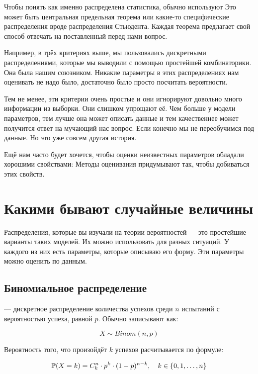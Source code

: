 \documentclass[12pt, a4paper, oneside]{article}
\begin{document}
Чтобы понять как именно распределена статистика, обычно используют  Это может быть центральная предельная теорема или какие-то специфические распределения вроде распределения Стьюдента. Каждая теорема предлагает свой способ отвечать на поставленный перед нами вопрос. 

Например, в трёх критериях выше, мы пользовались дискретными распределениями, которые мы выводили с помощью простейшей комбинаторики. Она была нашим союзником. Никакие параметры в этих распределениях нам оценивать не надо было, достаточно было просто посчитать вероятности. 

Тем не менее, эти критерии очень простые и они игнорируют довольно много информации из выборки. Они слишком упрощают её. Чем больше у модели параметров, тем лучше она может описать данные и тем качественнее может получится ответ на мучающий нас вопрос. Если конечно мы не переобучимся под данные. Но это уже совсем другая история.

Ещё нам часто будет хочется, чтобы оценки неизвестных параметров обладали хорошими свойствами:  Методы оценивания придумывают так, чтобы добиваться этих свойств.




\section{Какими бывают случайные величины}

Распределения, которые вы изучали на теории вероятностей --- это простейшие варианты таких моделей. Их можно использовать для разных ситуаций. У каждого из них есть параметры, которые описываю его форму. Эти параметры можно оценить по данным. 

\subsection*{Биномиальное распределение}

 --- дискретное распределение количества успехов среди $n$ испытаний с вероятностью успеха, равной $p$. Обычно записывают как:

$$
X \sim Binom(n, p)
$$

Вероятность того, что произойдёт $k$ успехов расчитывается по формуле: 

$$
\mathbb{P}(X = k) = {C}^n_k \cdot p^k \cdot (1 - p)^{n - k}, \quad k \in \{0, 1, \ldots, n\}
$$
\end{document}
